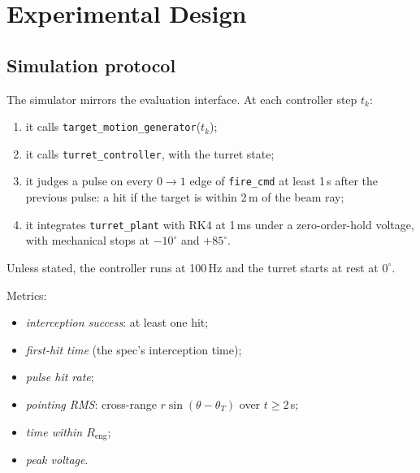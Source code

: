 \documentclass[11pt,a4paper]{article}
\newcommand{\Reng}{R_{\mathrm{eng}}}
\begin{document}
\section{Experimental Design}

\subsection{Simulation protocol}
The simulator mirrors the evaluation interface. At each controller step $t_k$:
\begin{enumerate}
\item it calls \texttt{target\_motion\_generator}($t_k$);
\item it calls \texttt{turret\_controller}, with the turret state;
\item it judges a pulse on every $0\to1$ edge of \texttt{fire\_cmd} at least 1\,s after the previous pulse: a hit if the target is within 2\,m of the beam ray;
\item it integrates \texttt{turret\_plant} with RK4 at 1\,ms under a zero-order-hold voltage, with mechanical stops at $-10^\circ$ and $+85^\circ$.
\end{enumerate}
Unless stated, the controller runs at 100\,Hz and the turret starts at rest at $0^\circ$.

Metrics:
\begin{itemize}
\item \emph{interception success}: at least one hit;
\item \emph{first-hit time} (the spec's interception time);
\item \emph{pulse hit rate};
\item \emph{pointing RMS}: cross-range $r\sin(\theta-\theta_T)$ over $t\ge2$\,s;
\item \emph{time within $\Reng$};
\item \emph{peak voltage}.
\end{itemize}
\end{document}
